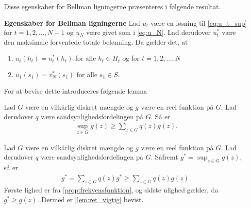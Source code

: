 Disse egenskaber for Bellman ligningerne præsenteres i følgende resultat.

\begin{minipage}\textwidth
\begin{thmx} \textbf{Egenskaber for Bellman ligningerne} \label{sæt:ret_så_vigtig}%
\newline
Lad $u_t$ være en løsning til \eqref{eq:u_t_sup} for $t = 1, 2, \ldots, N-1$ og $u_N$ være givet som i \eqref{eq:u_N}. Lad derudover $u_t^*$ være den maksimale forventede totale belønning. Da gælder det, at
\begin{enumerate}
    \item $u_t(h_t)=u_t^*(h_t)$ for alle $h_t\in H_t$ og for $t=1, 2,\ldots, N$
    \item $u_1(s_1)=v_N^*(s_1)$ for alle $s_1\in S$.
\end{enumerate}
\end{thmx}
\end{minipage}

For at bevise dette introduceres følgende lemma

\begin{minipage}\textwidth
\begin{lem} \label{lem:ret_vigtig}\textbf{} %
\newline
Lad $G$ være en vilkårlig diskret mængde og $g$ være en reel funktion på $G$. Lad derudover $q$ være sandsynlighedsfordelingen på $G$. Så er 
\begin{align*}
    \sup_{z\in G}g(z)\geq \sum_{z\in G}q(z)g(z).
\end{align*}
\end{lem}
\end{minipage}

\begin{bev} \textbf{} %
\newline
Lad $G$ være en vilkårlig diskret mængde og $g$ være en reel funktion på $G$. Lad derudover $q$ være sandsynlighedsfordelingen på $G$. Såfremt $\displaystyle g^*=\sup_{z\in G}g(z)$, så er 
\begin{align*}
    g^* = \sum_{z \in G} q(z)g^* \geq \sum_{z \in G} q(z)g(z).
\end{align*}
Første lighed er fra \autoref{prop:frekvensfunktion}, og sidste ulighed gælder, da $g^* \geq g(z)$. Dermed er \autoref{lem:ret_vigtig} bevist.
\end{bev}

